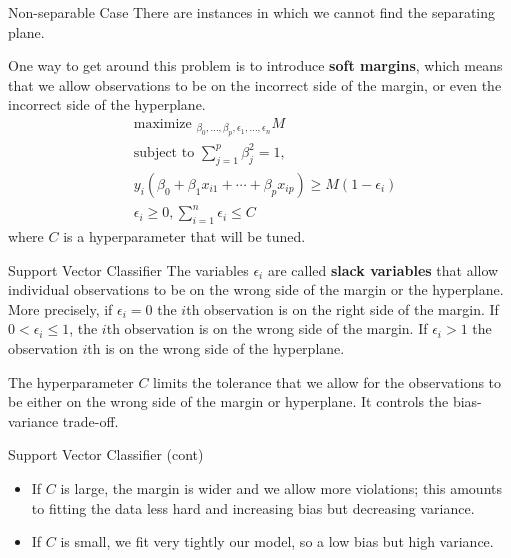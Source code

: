 \documentclass{beamer}
\begin{document}
\begin{frame}{Non-separable Case}
	There are instances in which we cannot find the separating plane.
	
	One way to get around this problem is to introduce {\bf soft margins}, which means that we allow observations to be on the incorrect side of the margin, or even the incorrect side of the hyperplane. 
	\begin{equation*}
		\begin{split}
			&\textrm{maximize }_{\beta_0,\ldots, \beta_p,\epsilon_1,\ldots,\epsilon_n} M \\
			&\textrm{subject to } \sum_{j=1}^p \beta_j^2 =1 , \\
			& y_i (\beta_0 + \beta_1 x_{i1}+ \cdots + \beta_p x_{ip} )\ge M (1-\epsilon_i) \\
			& \epsilon_i \ge 0, \sum_{i=1}^n \epsilon_i \le C 
		\end{split}
	\end{equation*}
	where $C$ is a hyperparameter that will be tuned.
	
	 
\end{frame}
\begin{frame}{Support Vector Classifier}
The variables $\epsilon_i$ are called {\bf slack variables} that allow individual observations to be on the wrong side of the margin or the hyperplane. More precisely, if $\epsilon_i=0$ the  $i$th observation is on the right side of the margin. If $0< \epsilon_i \le 1$, the $i$th observation is on the wrong side of the margin. If $\epsilon_i>1$ the observation $i$th is on the wrong side of the hyperplane. 


The hyperparameter $C$ limits the tolerance that we allow for the observations to be either on the wrong side of the margin or hyperplane. It controls the bias-variance trade-off. 

\end{frame}
\begin{frame}{Support Vector Classifier (cont)}
	
\begin{itemize}
	\item If $C$ is large, the margin is wider and we allow more violations; this amounts to fitting the data less hard and increasing bias but decreasing variance. 
	\item If $C$ is small, we fit very tightly our model, so a low bias but high variance.
\end{itemize}


\end{frame}
\end{document}
